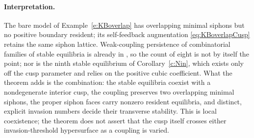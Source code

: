 \paragraph{Interpretation.}
The bare model of Example~\ref{e:KBoverlap} has overlapping minimal
siphons but no positive boundary resident; its self-feedback
augmentation \eqref{eq:KBoverlapCusp} retains the same siphon lattice.
Weak-coupling persistence of combinatorial families of stable
equilibria is already in \cite{Boud26}, so the count of eight is
not by itself the point; nor is the ninth stable equilibrium of
Corollary~\ref{c:Nin}, which exists only off the cusp parameter and relies on
the positive cubic coefficient. What the theorem adds is the combination:
the stable equilibria coexist with a nondegenerate interior cusp,
the coupling preserves two overlapping minimal siphons, the proper
siphon faces carry nonzero resident equilibria, and distinct,
explicit invasion numbers decide their transverse stability.
This is local coexistence; the theorem does not assert that the cusp
itself crosses either invasion-threshold hypersurface as a coupling is varied.